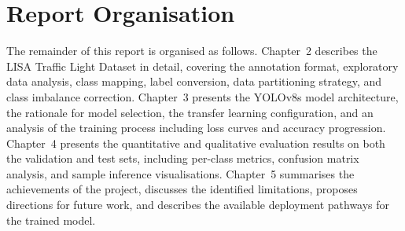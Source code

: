 \section{Report Organisation}

The remainder of this report is organised as follows. Chapter~2 describes the LISA Traffic Light Dataset in detail, covering the annotation format, exploratory data analysis, class mapping, label conversion, data partitioning strategy, and class imbalance correction. Chapter~3 presents the YOLOv8s model architecture, the rationale for model selection, the transfer learning configuration, and an analysis of the training process including loss curves and accuracy progression. Chapter~4 presents the quantitative and qualitative evaluation results on both the validation and test sets, including per-class metrics, confusion matrix analysis, and sample inference visualisations. Chapter~5 summarises the achievements of the project, discusses the identified limitations, proposes directions for future work, and describes the available deployment pathways for the trained model.

